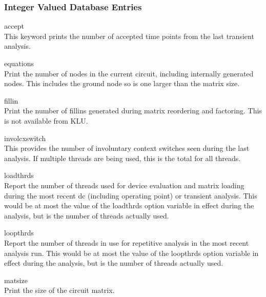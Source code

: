 \subsubsection{Integer Valued Database Entries}

\begin{description}
\item{\vt accept}\\
This keyword prints the number of accepted time points from the last
transient analysis.

\item{\vt equations}\\
Print the number of nodes in the current circuit, including internally
generated nodes.  This includes the ground node so is one larger than
the matrix size.

\item{\vt fillin}\\
Print the number of fillins generated during matrix reordering and
factoring.  This is not available from KLU.

\item{\vt involcxswitch}\\
This provides the number of involuntary context switches seen during
the last analysis.  If multiple threads are being used, this is the
total for all threads.

\item{\vt loadthrds}\\
Report the number of threads used for device evaluation and matrix
loading during the most recent dc (including operating point) or
transient analysis.  This would be at most the value of the {\et
loadthrds} option variable in effect during the analysis, but is the
number of threads actually used.

\item{\vt loopthrds}\\
Report the number of threads in use for repetitive analysis in the
most recent analysis run.  This would be at most the value of the {\et
loopthrds} option variable in effect during the analysis, but is the
number of threads actually used.

\item{\vt matsize}\\
Print the size of the circuit matrix.


\end{description}

